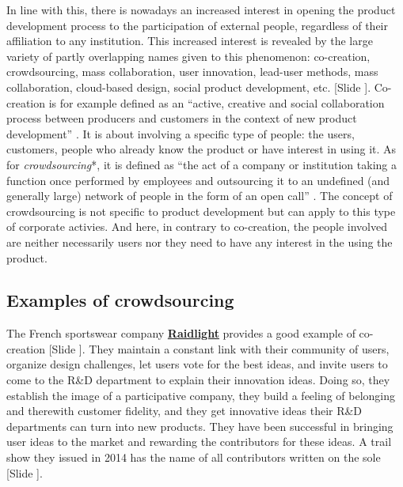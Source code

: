 \documentclass{article}
\newcounter{slide}
\begin{document}
In line with this, there is nowadays an increased interest in opening the product development process to the participation of external people, regardless of their affiliation to any institution. This increased interest is revealed by the large variety of partly overlapping names given to this phenomenon: co-creation, crowdsourcing, mass collaboration, user innovation, lead-user methods, mass collaboration, cloud-based design, social product development, etc. {\color{blue}[Slide ]}. Co-creation is for example defined as an ``active, creative and social collaboration process between producers and customers in the context of new product development'' \cite{pillerSocialMediaSocial2011}. It is about involving a specific type of people: the users, customers, people who already know the product or have interest in using it. As for \emph{crowdsourcing}*, it is defined as ``the act of a company or institution taking a function once performed by employees and outsourcing it to an undefined (and generally large) network of people in the form of an open call'' \cite{howeCrowdsourcingDefinition2006}. The concept of crowdsourcing is not specific to product development but can apply to this type of corporate activies. And here, in contrary to co-creation, the people involved are neither necessarily users nor they need to have any interest in the using the product. 

\subsection{Examples of crowdsourcing}
\label{sec:CSexamples}

The French sportswear company \textbf{\href{https://team.fr.raidlight.com/categories/atelier-de-conception-ouvert-a-tous.369/}{Raidlight}} provides a good example of co-creation {\color{blue} [Slide ]}. They maintain a constant link with their community of users, organize design challenges, let users vote for the best ideas, and invite users to come to the R\&D department to explain their innovation ideas. Doing so, they establish the image of a participative company, they build a feeling of belonging and therewith customer fidelity, and they get innovative ideas their R\&D departments can turn into new products. They have been successful in bringing user ideas to the market and rewarding the contributors for these ideas. A trail show they issued in 2014 has the name of all contributors written on the sole {\color{blue} [Slide ]}. 
\end{document}
